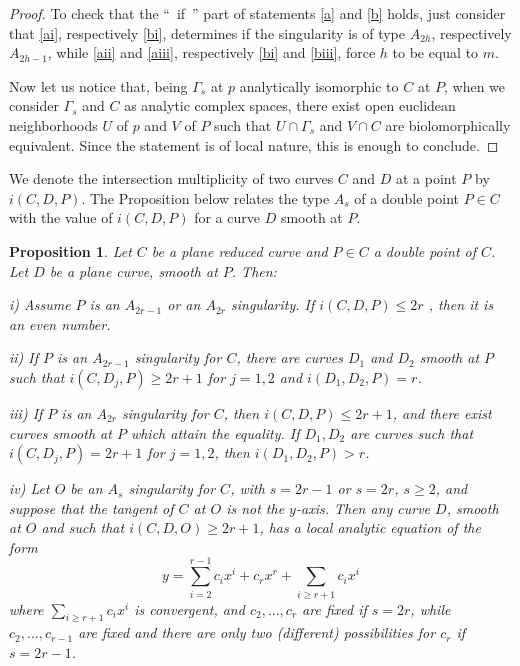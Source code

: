 \documentclass[draft]{amsart}
\newtheorem{prop}[thm]{Proposition}
\theoremstyle{definition}
\theoremstyle{remark}
\theoremstyle{definition}
\def\a{\bigskip \par \noindent}
\def\dd{\medskip \par \noindent}
\begin{document}
\begin{proof}
\dd To check that the ``~if~'' part of statements \eqref{a} and \eqref{b} holds, just consider that \eqref{ai}, respectively \eqref{bi}, determines if the singularity is of type $A_{2h}$, respectively $A_{2h-1}$, while \eqref{aii} and \eqref{aiii}, respectively \eqref{bi} and \eqref{biii}, force $h$ to be equal to $m$. 

Now let us notice that, being $\Gamma_s$  at $p$ analytically isomorphic to $C$ at $P$, when we consider $\Gamma_s$ and $C$ as analytic complex spaces, there exist open euclidean neighborhoods $U$ of $p$ and $V$ of $P$ such that $U\cap \Gamma_s$ and $V\cap C$ are biolomorphically equivalent. Since the statement is of local nature, this is enough to conclude.
 \end{proof}
 
\a We denote the intersection multiplicity of two curves $C$ and $D$ at a point $P$ by $i(C,D,P)$. The Proposition below relates the type $A_s$ of a double point $P\in C$ with the value of $i(C,D,P)$ for a curve $D$ smooth at $P$.


\begin{prop}\label{Lemma}  Let $C$ be a plane reduced curve and $P\in C$ a double point of $C$. Let $D$ be a plane curve, smooth at $P$. Then:

\dd i) Assume $P$ is an $A_{2r-1}$ or an $A_{2r}$ singularity. If $i(C,D,P) \leq 2r$ , then it is an even number.

\dd ii) If $P$ is an $A_{2r-1}$ singularity for $C$, there are curves $D_1$ and $D_2$ smooth at $P$ such that $i(C,D_j,P)\geq 2r+1$ for $j=1,2$ and $i(D_1,D_2,P)=r$.

\dd iii)  If $P$ is an $A_{2r}$ singularity for $C$, then $i(C,D,P)\leq 2r+1$, and there exist curves smooth at $P$ which attain the equality. If $D_1, D_2$ are curves such that $i(C,D_j,P)= 2r+1$ for $j=1,2$, then $i(D_1,D_2,P)>r$.

\dd iv)  Let $O$ be an $A_{s}$ singularity for $C$, with $s=2r-1$ or $s=2r$, $s\geq 2$, and suppose that the tangent of $C$ at $O$ is not the $y$-axis. Then any  curve  $D$, smooth at $O$ and such that $i(C,D,O)\geq 2r+1$,  has a local analytic equation of the form  $$y=\sum_{i= 2}^{r-1} c_ix^i +c_rx^r+\sum_{i\geq r+1} c_ix^i $$ where   $\sum_{i\geq r+1} c_ix^i $ is convergent, and $c_2,...,c_{r}$ are fixed if $s=2r$, while $c_2,...,c_{r-1}$ are fixed and there are only two (different) possibilities for  $c_r$ if  $s=2r-1$.
\end{prop}
\end{document}
